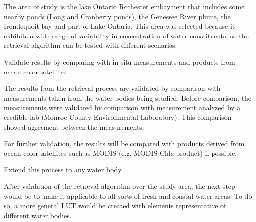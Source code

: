 \begin{enumerate}
The area of study is the lake Ontario Rochester embayment that includes some nearby ponds (Long and Cranberry ponds), the Genessee River plume, the Irondequoit bay and part of Lake Ontario. This area was selected because it exhibits a wide range of variability in concentration of water constituents, so the retrieval algorithm can be tested with different scenarios.
 
	{\bf \item Validate results by comparing with in-situ measurements and products from ocean color satellites.}

The results from the retrieval process are validated by comparison with measurements taken from the water bodies being studied. Before comparison, the measurements were validated by comparison with measurement analyzed by a credible lab (Monroe County Environmental Laboratory). This comparison showed agreement between the measurements. 

 For further validation, the results will be compared with products derived from ocean color satellites such as MODIS (e.g. MODIS Chl{\it a} product) if possible.

	{\bf \item {} Extend this process to any water body.}

After validation of the retrieval algorithm over the study area, the next step would be to make it applicable to all sorts of fresh and coastal water areas. To do so, a more general LUT would be created with elements representative of different water bodies.


\end{enumerate}


